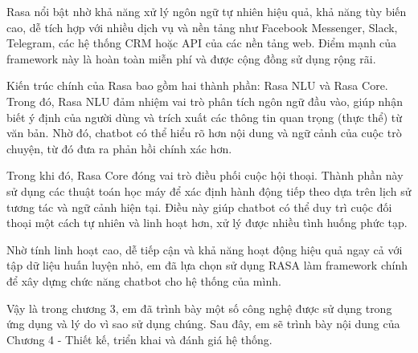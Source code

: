 \documentclass[../DoAn.tex]{subfiles}
\begin{document}
Rasa nổi bật nhờ khả năng xử lý ngôn ngữ tự nhiên hiệu quả, khả năng tùy biến cao, dễ tích hợp với nhiều dịch vụ và nền tảng như Facebook Messenger, Slack, Telegram, các hệ thống CRM hoặc API của các nền tảng web. Điểm mạnh của framework này là hoàn toàn miễn phí và được cộng đồng sử dụng rộng rãi.

Kiến trúc chính của Rasa bao gồm hai thành phần: Rasa NLU và Rasa Core. Trong đó, Rasa NLU đảm nhiệm vai trò phân tích ngôn ngữ đầu vào, giúp nhận biết ý định của người dùng và trích xuất các thông tin quan trọng (thực thể) từ văn bản. Nhờ đó, chatbot có thể hiểu rõ hơn nội dung và ngữ cảnh của cuộc trò chuyện, từ đó đưa ra phản hồi chính xác hơn.

Trong khi đó, Rasa Core đóng vai trò điều phối cuộc hội thoại. Thành phần này sử dụng các thuật toán học máy để xác định hành động tiếp theo dựa trên lịch sử tương tác và ngữ cảnh hiện tại. Điều này giúp chatbot có thể duy trì cuộc đối thoại một cách tự nhiên và linh hoạt hơn, xử lý được nhiều tình huống phức tạp.

Nhờ tính linh hoạt cao, dễ tiếp cận và khả năng hoạt động hiệu quả ngay cả với tập dữ liệu huấn luyện nhỏ, em đã lựa chọn sử dụng RASA làm framework chính để xây dựng chức năng chatbot cho hệ thống của mình.

Vậy là trong chương 3, em đã trình bày một số công nghệ được sử dụng trong ứng dụng và lý do vì sao sử dụng chúng. Sau đây, em sẽ trình bày nội dung của Chương 4 - Thiết kế, triển khai và đánh giá hệ thống.
\end{document}

